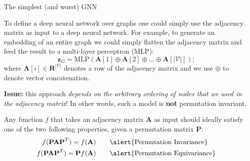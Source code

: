 \documentclass[10pt, aspectratio=169, compress, protectframetitle, handout]{beamer}
\begin{document}
\begin{frame}{The simplest (and worst) GNN}

    To define a \alert{deep neural network over graphs} one could simply use the adjacency matrix as input to a deep neural network. For example, to generate an embedding of an entire graph we could simply flatten the adjacency matrix and feed the result to a multi-layer perceptron (MLP):
    \begin{equation}
        \mathbf z_G = \text{MLP}(\mathbf A[1] \oplus \mathbf A[2] \oplus \ldots \oplus \mathbf A[|\mathcal V|]);
    \end{equation}
    where $\mathbf A[i] \in \mathbf R^{|\mathcal V|}$ denotes a row of the adjacency matrix and we use $\oplus$ to denote vector concatenation.
    
    \textbf{Issue:} this approach \textit{depends on the arbitrary ordering of nodes that we used in the adjacency matrix}! In other words, such a model is \alert{\textbf{not} permutation invariant}.
    
    \begin{block}{}
    Any function $f$ that takes an adjacency matrix $\mathbf A$ as input should ideally satisfy one of the two following properties, given a permutation matrix $\mathbf P$:
    \begin{align}
        f(\mathbf{PAP}^T) = f(\mathbf A) \qquad &\text{\alert{Permutation Invariance}} \\
        f(\mathbf{PAP}^T) = \mathbf P f(\mathbf A) \qquad &\text{\alert{Permutation Equivariance}}
    \end{align}
    \end{block}
\end{frame}
\end{document}
